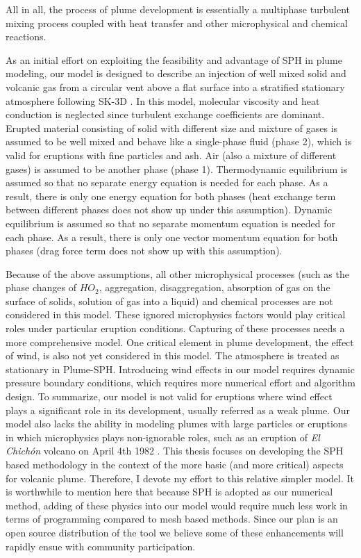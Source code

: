 All in all, the process of plume development is essentially a multiphase turbulent mixing process coupled with heat transfer and other microphysical and chemical reactions.

As an initial effort on exploiting the feasibility and advantage of SPH in plume modeling, our model is designed to describe an injection of well mixed solid and volcanic gas from a circular vent above a flat surface into a stratified stationary atmosphere following SK-3D \citep{suzuki2005numerical}. In this model, molecular viscosity and heat conduction is neglected since turbulent exchange coefficients are dominant. Erupted material consisting of solid with different size and mixture of gases is assumed to be well mixed and behave like a single-phase fluid (phase 2), which is valid for eruptions with fine particles and ash. Air (also a mixture of different gases) is assumed to be another phase (phase 1). Thermodynamic equilibrium is assumed so that no separate energy equation is needed for each phase. As a result, there is only one energy equation for both phases (heat exchange term between different phases does not show up under this assumption). Dynamic equilibrium is assumed so that no separate momentum equation is needed for each phase. As a result, there is only one vector momentum equation for both phases (drag force term does not show up with this assumption). 

Because of the above assumptions, all other microphysical processes (such as the phase changes of $HO_2$, aggregation, disaggregation, absorption of gas on the surface of solids, solution of gas into a liquid) and chemical processes are not considered in this model. These ignored microphysics factors would play critical roles under particular eruption conditions. Capturing of these processes needs a more comprehensive model. One critical element in plume development, the effect of wind, is also not yet considered in this model. The atmosphere is treated as stationary in Plume-SPH. Introducing wind effects in our model requires dynamic pressure boundary conditions, which requires more numerical effort and algorithm design. To summarize, our model is not valid for eruptions where wind effect plays a significant role in its development, usually referred as a weak plume. Our model also lacks the ability in modeling plumes with large particles or eruptions in which microphysics plays non-ignorable roles, such as an eruption of \textit{El Chich{\'o}n} volcano on April 4th 1982 \citep{sigurdsson19841982, folch2016fplume}. This thesis focuses on developing the SPH based methodology in the context of the more basic (and more critical) aspects for volcanic plume. Therefore, I devote my effort to this relative simpler model. It is worthwhile to mention here that because SPH is adopted as our numerical method, adding of these physics into our model would require much less work in terms of programming compared to mesh based methods. Since our plan is an open source distribution of the tool we believe some of these enhancements will rapidly ensue with community participation.

